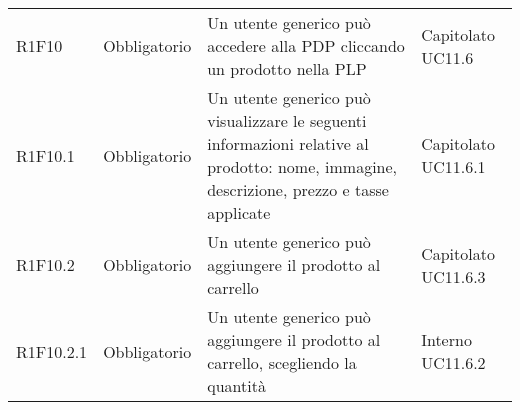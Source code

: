 {\begin{longtable}{C{2.5cm} C{2.8cm} C{6.7cm} C{2.5cm}}

R1F10 & Obbligatorio & Un utente generico può accedere alla PDP cliccando un prodotto nella PLP & Capitolato \newline UC11.6\\
R1F10.1 & Obbligatorio & Un utente generico può visualizzare le seguenti informazioni relative al prodotto: nome, immagine, descrizione, prezzo e tasse applicate & Capitolato \newline UC11.6.1\\
R1F10.2 & Obbligatorio & Un utente generico può aggiungere il prodotto al carrello & Capitolato \newline UC11.6.3\\
R1F10.2.1 & Obbligatorio & Un utente generico può aggiungere il prodotto al carrello, scegliendo la quantità & Interno \newline UC11.6.2 \\

\end{longtable}

}